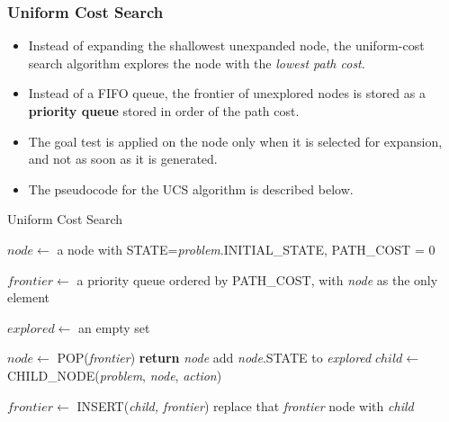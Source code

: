 \documentclass{article}
\theoremstyle{plain}
\theoremstyle{definition}
\begin{document}
\subsubsection{Uniform Cost Search}
\begin{itemize}
    \item Instead of expanding the shallowest unexpanded node, the uniform-cost search algorithm explores the node with the \textit{lowest path cost}. 
    
    \item Instead of a FIFO queue, the frontier of unexplored nodes is stored as a \textbf{priority queue} stored in order of the path cost. 
    
    \item The goal test is applied on the node only when it is selected for expansion, and not as soon as it is generated. 
    
    \item The pseudocode for the UCS algorithm is described below.

\end{itemize}
\break

\begin{algorithm}
    \caption{Uniform Cost Search}
    \begin{algorithmic}
            \State $node \gets $ a node with STATE=\textit{problem}.INITIAL\_STATE, PATH\_COST = 0
            
            \State $frontier \gets $ a priority queue ordered by PATH\_COST, with \textit{node} as the only element
            
            \State $explored \gets$ an empty set
            
                \State $node \gets $ POP(\textit{frontier})
                    \State \textbf{return} \textit{node}
                \EndIf
                \State add \textit{node}.STATE to \textit{explored}
                    \State $child \gets$ CHILD\_NODE(\textit{problem}, \textit{node}, \textit{action})
                    
                        \State $frontier \gets$ INSERT(\textit{child, frontier})
                        \State replace that \textit{frontier} node with \textit{child}
                    \EndIf
                \EndFor
            \EndWhile
        \EndProcedure
    \end{algorithmic}
\end{algorithm}
\end{document}
